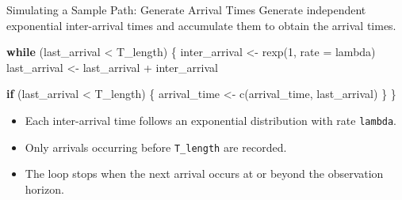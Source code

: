 \documentclass[
  ignorenonframetext,
  aspectratio=169,
]{beamer}
\newenvironment{Shaded}{\begin{snugshade}}{\end{snugshade}}
\newcommand{\AttributeTok}[1]{\textcolor[rgb]{0.40,0.45,0.13}{#1}}
\newcommand{\ControlFlowTok}[1]{\textcolor[rgb]{0.00,0.23,0.31}{\textbf{#1}}}
\newcommand{\DecValTok}[1]{\textcolor[rgb]{0.68,0.00,0.00}{#1}}
\newcommand{\FunctionTok}[1]{\textcolor[rgb]{0.28,0.35,0.67}{#1}}
\newcommand{\NormalTok}[1]{\textcolor[rgb]{0.00,0.23,0.31}{#1}}
\newcommand{\OtherTok}[1]{\textcolor[rgb]{0.00,0.23,0.31}{#1}}
\newcommand{\SpecialCharTok}[1]{\textcolor[rgb]{0.37,0.37,0.37}{#1}}
\providecommand{\tightlist}{%
  \setlength{\itemsep}{0pt}\setlength{\parskip}{0pt}}
\begin{document}
\begin{frame}[fragile]{Simulating a Sample Path: Generate Arrival Times}
\protect{}\label{simulating-a-sample-path-generate-arrival-times}
Generate independent exponential inter-arrival times and accumulate them
to obtain the arrival times.

\begin{Shaded}
\begin{Highlighting}[]
\ControlFlowTok{while}\NormalTok{ (last\_arrival }\SpecialCharTok{\textless{}}\NormalTok{ T\_length) \{}
\NormalTok{  inter\_arrival }\OtherTok{\textless{}{-}} \FunctionTok{rexp}\NormalTok{(}\DecValTok{1}\NormalTok{, }\AttributeTok{rate =}\NormalTok{ lambda)}
\NormalTok{  last\_arrival }\OtherTok{\textless{}{-}}\NormalTok{ last\_arrival }\SpecialCharTok{+}\NormalTok{ inter\_arrival}

  \ControlFlowTok{if}\NormalTok{ (last\_arrival }\SpecialCharTok{\textless{}}\NormalTok{ T\_length) \{}
\NormalTok{    arrival\_time }\OtherTok{\textless{}{-}} \FunctionTok{c}\NormalTok{(arrival\_time, last\_arrival)}
\NormalTok{  \}}
\NormalTok{\}}
\end{Highlighting}
\end{Shaded}

\begin{itemize}
\tightlist
\item
  Each inter-arrival time follows an exponential distribution with rate
  \texttt{lambda}.
\item
  Only arrivals occurring before \texttt{T\_length} are recorded.
\item
  The loop stops when the next arrival occurs at or beyond the
  observation horizon.
\end{itemize}
\end{frame}
\end{document}
